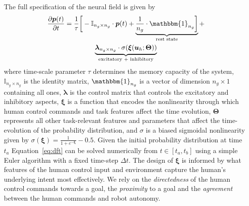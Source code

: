 \documentclass[conference]{IEEEtran}
\begin{document}
The full specification of the neural field is given by
\begin{multline}\label{eq:dft}
\frac{\partial \boldsymbol{p}(t)}{\partial t} = \frac{1}{\tau}\bigg[-\mathbb{I}_{n_g\times n_g}\cdot\boldsymbol{p}(t) + \underbrace{\frac{1}{n_g}\cdot\mathbbm{1}_{n_g}\bigg]}_{\text{rest state}} + \\ \underbrace{\boldsymbol{\lambda}_{n_g\times n_g}\cdot\sigma(\boldsymbol{\xi}(\boldsymbol{u}_h;\boldsymbol{\Theta}))}_{\text{excitatory + inhibitory}}
\end{multline}
where time-scale parameter $\tau$ determines the memory capacity of the system, $\mathbb{I}_{n_g\times n_g}$ is the identity matrix, $\mathbbm{1}_{n_g}$ is a vector of dimension $n_g \times 1$ containing all ones, $\boldsymbol{\lambda}$ is the control matrix that controls the excitatory and inhibitory aspects, $\boldsymbol{\xi}$ is a function that encodes the nonlinearity through which human control commands and task features affect the time evolution, $\boldsymbol{\Theta}$ represents all other task-relevant features and parameters that affect the time-evolution of the probability distribution, and $\sigma$ is a biased sigmoidal nonlinearity given by $\sigma(\boldsymbol{\xi}) = \frac{1}{1 + e^{-\boldsymbol{\xi}}} - 0.5$. 
Given the initial probability distribution at time $t_a$ Equation~\ref{eq:dft} can be solved numerically from $t \in [t_a, t_b]$ using a simple Euler algorithm with a fixed time-step $\Delta t$. The design of $\boldsymbol{\xi}$ is informed by what features of the human control input and environment capture the human's underlying intent most effectively. We rely on the \textit{directedness} of the human control commands towards a goal, the \textit{proximity} to a goal and the \textit{agreement} between the human commands and robot autonomy.
\end{document}
